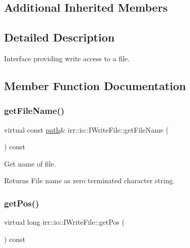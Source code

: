 \subsection*{Additional Inherited Members}


\subsection{Detailed Description}
Interface providing write access to a file. 

\subsection{Member Function Documentation}
\mbox{\label{classirr_1_1io_1_1IWriteFile_ad129ab8feac03f06f2edf685df6a0236}} 
\subsubsection{\texorpdfstring{get\+File\+Name()}{getFileName()}}
{\footnotesize\ttfamily virtual const \hyperlink{namespaceirr_1_1io_ab1bdc45edb3f94d8319c02bc0f840ee1}{path}\& irr\+::io\+::\+I\+Write\+File\+::get\+File\+Name (\begin{DoxyParamCaption}{ }\end{DoxyParamCaption}) const\hspace{0.3cm}{\ttfamily [pure virtual]}}



Get name of file. 

\begin{DoxyReturn}{Returns}
File name as zero terminated character string. 
\end{DoxyReturn}
\mbox{\label{classirr_1_1io_1_1IWriteFile_a062eaf082b6f4d05cf0e44b85aa7a6ab}} 
\subsubsection{\texorpdfstring{get\+Pos()}{getPos()}}
{\footnotesize\ttfamily virtual long irr\+::io\+::\+I\+Write\+File\+::get\+Pos (\begin{DoxyParamCaption}{ }\end{DoxyParamCaption}) const\hspace{0.3cm}{\ttfamily [pure virtual]}}



